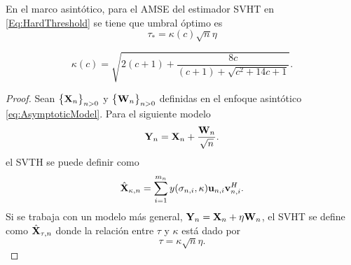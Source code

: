 	\begin{theorem}\cite[Teorema 4]{Gavish2014}\label{Theo:Gavish}
		En el marco asintótico, para el AMSE del estimador SVHT en \eqref{Eq:HardThreshold} se tiene que  umbral óptimo es
		\begin{equation}
	   	    \tau_* = \kappa(c)\sqrt{n}\eta
		      \label{Eq:ThresholdGavish}
		\end{equation}
				
		\begin{equation}
			\kappa(c) = %
			\sqrt{2(c+1)+\frac{8c}{(c+1)+\sqrt{c^2+14c+1}}}. 
		\end{equation}
	\end{theorem} 
    \begin{proof}
        Sean $\big\{\mathbf{X}_n\big\}_{n>0}$ y $\big\{\mathbf{W}_n\big\}_{n>0}$ definidas en el enfoque asintótico \eqref{eq:AsymptoticModel}. Para el siguiente modelo
        \[\mathbf{Y}_n = \mathbf{X}_n + \frac{\mathbf{W}_n}{\sqrt{n}}.\]
        el SVTH se puede definir como
        \begin{equation}
            \hat{\mathbf{X}}_{\kappa,n} = \sum_{i=1}^{m_n}y(\sigma_{n,i},\kappa)\mathbf{u}_{n,i}\mathbf{v}^H_{n,i}.
            \label{Eq:SVHT_natural}
        \end{equation}
        Si se trabaja con un modelo más general, $\mathbf{Y}_n = \mathbf{X}_n + \eta\mathbf{W}_n$, el SVHT se define como $\hat{\mathbf{X}}_{\tau,n}$ donde la relación entre $\tau$ y $\kappa$ está dado por \begin{equation}\tau = \kappa\sqrt{n}\eta.\label{eq:tau_kappa}\end{equation}


\end{proof}
